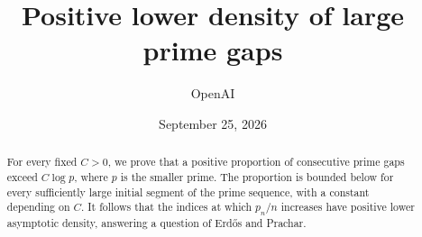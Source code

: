 \documentclass[11pt]{article}
\title{Positive lower density of large prime gaps}
\author{OpenAI}
\date{September 25, 2026}
\theoremstyle{remark}
\begin{document}
\maketitle
\begin{abstract}
For every fixed $C>0$, we prove that a positive proportion of consecutive
prime gaps exceed $C\log p$, where $p$ is the smaller prime. The proportion
is bounded below for every sufficiently large initial segment of the
prime sequence, with a constant depending on $C$. It follows that the
indices at which $p_n/n$ increases have positive lower asymptotic density,
answering a question of Erd\H{o}s and Prachar.
\end{abstract}
\tableofcontents






{\raggedright}
\end{document}
